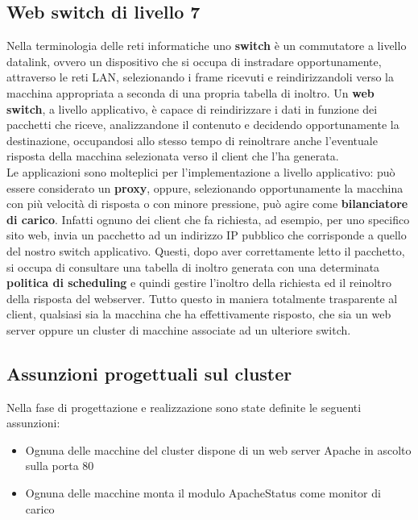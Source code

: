 \documentclass[italian]{tktltiki2}
\begin{document}
\subsection{Web switch di livello 7}
Nella terminologia delle reti informatiche uno \textbf{switch} è un commutatore a livello datalink, ovvero un dispositivo che si occupa di instradare opportunamente, attraverso le reti LAN, selezionando i frame ricevuti e reindirizzandoli verso la macchina appropriata a seconda di una propria tabella di inoltro. Un \textbf{web switch}, a livello applicativo, è capace di reindirizzare i dati in funzione dei pacchetti che riceve, analizzandone il contenuto e decidendo opportunamente la destinazione, occupandosi allo stesso tempo di reinoltrare anche l'eventuale risposta della macchina selezionata verso il client che l'ha generata.
\\
Le applicazioni sono molteplici per l'implementazione a livello applicativo: può essere considerato un \textbf{proxy}, oppure, selezionando opportunamente la macchina con più velocità di risposta o con minore pressione, può agire come \textbf{bilanciatore di carico}. Infatti ognuno dei client che fa richiesta, ad esempio, per uno specifico sito web, invia un pacchetto ad un indirizzo IP pubblico che corrisponde a quello del nostro switch applicativo. Questi, dopo aver correttamente letto il pacchetto, si occupa di consultare una tabella di inoltro generata con una determinata \textbf{politica di scheduling} e quindi gestire l'inoltro della richiesta ed il reinoltro della risposta del webserver. Tutto questo in maniera totalmente trasparente al client, qualsiasi sia la macchina che ha effettivamente risposto, che sia un web server oppure un cluster di macchine associate ad un ulteriore switch.

\subsection{Assunzioni progettuali sul cluster}
Nella fase di progettazione e realizzazione sono state definite le seguenti assunzioni:
\begin{itemize}
	\item Ognuna delle macchine del cluster dispone di un web server Apache\cite{apache_server} in ascolto sulla porta 80
	\item Ognuna delle macchine monta il modulo ApacheStatus come monitor di carico
\end{itemize}
\end{document}
